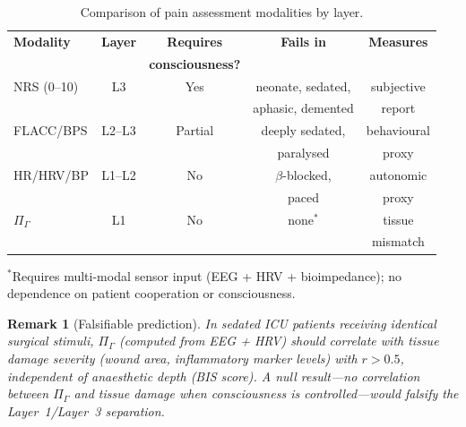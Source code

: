 \documentclass[aps,pre,twocolumn,superscriptaddress,floatfix]{revtex4-2}
\newtheorem{remark}{Remark}
\begin{document}
\begin{table}[h]
\caption{Comparison of pain assessment modalities by layer.}
\label{tab:pain-layers}
\begin{ruledtabular}
\begin{tabular}{lcccc}
\textbf{Modality} & \textbf{Layer} &
  \textbf{Requires} & \textbf{Fails in} &
  \textbf{Measures} \\
  & & \textbf{consciousness?} & & \\
\hline
NRS (0--10) & L3 & Yes & neonate, sedated, & subjective \\
  & & & aphasic, demented & report \\
FLACC/BPS & L2--L3 & Partial & deeply sedated, & behavioural \\
  & & & paralysed & proxy \\
HR/HRV/BP & L1--L2 & No & $\beta$-blocked, & autonomic \\
  & & & paced & proxy \\
$\Pi_{\Gamma}$ & L1 & No & none$^*$ & tissue \\
  & & & & mismatch \\
\end{tabular}
\end{ruledtabular}
{\footnotesize $^*$Requires multi-modal sensor input
(EEG + HRV + bioimpedance); no dependence on patient
cooperation or consciousness.}
\end{table}

\begin{remark}[Falsifiable prediction]
In sedated ICU patients receiving identical surgical
stimuli, $\Pi_{\Gamma}$ (computed from EEG + HRV)
should correlate with tissue damage severity
(wound area, inflammatory marker levels) with
$r>0.5$, \emph{independent} of anaesthetic depth
(BIS score).  A null result---no correlation between
$\Pi_{\Gamma}$ and tissue damage when consciousness
is controlled---would falsify the Layer~1/Layer~3
separation.
\end{remark}
\end{document}
